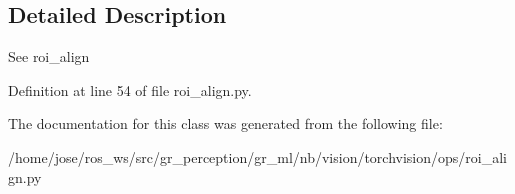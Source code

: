 \subsection{Detailed Description}
\begin{DoxyVerb}See roi_align
\end{DoxyVerb}
 

Definition at line 54 of file roi\+\_\+align.\+py.



The documentation for this class was generated from the following file\+:\begin{DoxyCompactItemize}
\item 
/home/jose/ros\+\_\+ws/src/gr\+\_\+perception/gr\+\_\+ml/nb/vision/torchvision/ops/roi\+\_\+align.\+py\end{DoxyCompactItemize}
